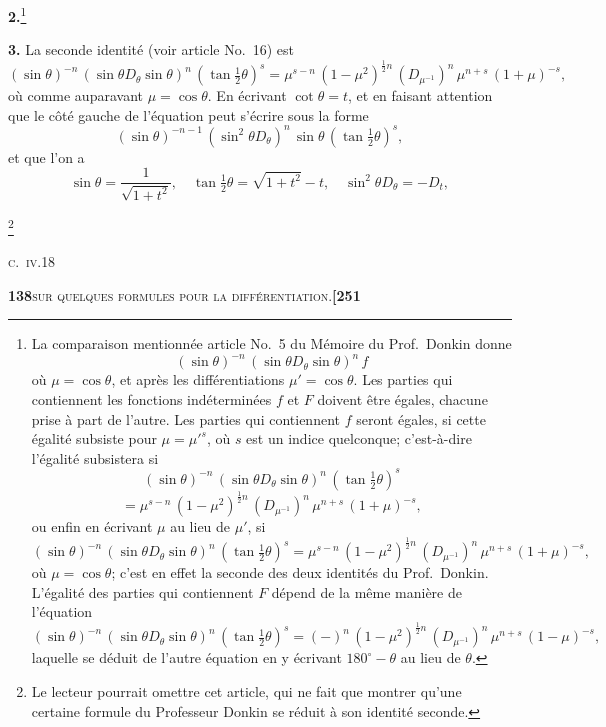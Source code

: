 \documentclass[11pt]{article}
\begin{document}
\textbf{2.}\footnote{La comparaison mentionnée article No.~5 du Mémoire du Prof.~Donkin donne
\[
(\sin\theta)^{-n}\,(\sin\theta D_{\theta} \sin\theta)^n\,f
\]
où $\mu = \cos\theta$, et après les différentiations $\mu' = \cos\theta$. Les parties qui contiennent les fonctions indéterminées $f$ et $F$ doivent être égales, chacune prise à part de l'autre. Les parties qui contiennent $f$ seront égales, si cette égalité subsiste pour $\mu = \mu'^s$, où $s$ est un indice quelconque; c'est-à-dire l'égalité subsistera si
\[
(\sin\theta)^{-n}\,(\sin\theta D_{\theta} \sin\theta)^n\,(\tan\tfrac{1}{2}\theta)^s
\]
\[
= \mu^{s-n}\,(1-\mu^2)^{\frac{1}{2}n}\,(D_{\mu^{-1}})^n\,\mu^{n+s}\,(1+\mu)^{-s},
\]
ou enfin en écrivant $\mu$ au lieu de $\mu'$, si
\[
(\sin\theta)^{-n}\,(\sin\theta D_{\theta} \sin\theta)^n\,(\tan\tfrac{1}{2}\theta)^s = \mu^{s-n}\,(1-\mu^2)^{\frac{1}{2}n}\,(D_{\mu^{-1}})^n\,\mu^{n+s}\,(1+\mu)^{-s},
\]
où $\mu = \cos\theta$; c'est en effet la seconde des deux identités du Prof.~Donkin. L'égalité des parties qui contiennent $F$ dépend de la même manière de l'équation
\[
(\sin\theta)^{-n}\,(\sin\theta D_{\theta} \sin\theta)^n\,(\tan\tfrac{1}{2}\theta)^s = (-)^n\,(1-\mu^2)^{\frac{1}{2}n}\,(D_{\mu^{-1}})^n\,\mu^{n+s}\,(1-\mu)^{-s},
\]
laquelle se déduit de l'autre équation en y écrivant $180^{\circ} - \theta$ au lieu de $\theta$.}

\medskip

\textbf{3.} La seconde identité (voir article No.~16) est
\[
(\sin\theta)^{-n}\,(\sin\theta D_{\theta} \sin\theta)^n\,(\tan\tfrac{1}{2}\theta)^s = \mu^{s-n}\,(1-\mu^2)^{\frac{1}{2}n}\,(D_{\mu^{-1}})^n\,\mu^{n+s}\,(1+\mu)^{-s},
\]
où comme auparavant $\mu = \cos\theta$. En écrivant $\cot\theta = t$, et en faisant attention que le côté gauche de l'équation peut s'écrire sous la forme
\[
(\sin\theta)^{-n-1}\,(\sin^2\theta D_{\theta})^n\,\sin\theta\,(\tan\tfrac{1}{2}\theta)^s,
\]
et que l'on a
\[
\sin\theta = \frac{1}{\sqrt{1+t^2}},\quad \tan\tfrac{1}{2}\theta = \sqrt{1+t^2} - t,\quad \sin^2\theta D_{\theta} = -D_t,
\]

\medskip

\noindent\footnote{Le lecteur pourrait omettre cet article, qui ne fait que montrer qu'une certaine formule du Professeur Donkin se réduit à son identité seconde.}

\medskip

\noindent\textsc{c.~iv.}\hfill 18

\newpage

\noindent\textbf{138}\hfill\textsc{sur quelques formules pour la différentiation.}\hfill\textbf{[251}
\end{document}
